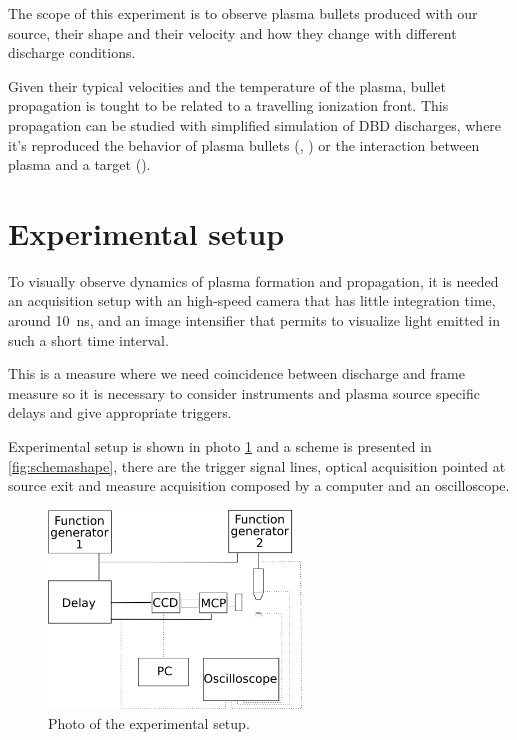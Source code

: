 The scope of this experiment is to observe plasma bullets produced with our source, their shape and their velocity and how they change with different discharge conditions.

Given their typical velocities and the temperature of the plasma, bullet propagation is tought to be related to a travelling ionization front. This propagation can be studied with simplified simulation of DBD discharges, where it's reproduced the behavior of plasma bullets (\cite{doi:10.1063/1.4963115}, \cite{Breden_2012}) or the interaction between plasma and a target (\cite{doi:10.1063/1.4923345}).

\section{Experimental setup}
To visually observe dynamics of plasma formation and propagation, it is needed an acquisition setup with an high-speed camera that has little integration time, around \SI{10}{\nano\second}, and an image intensifier that permits to visualize light emitted in such a short time interval.

This is a measure where we need coincidence between discharge and frame measure so it is necessary to consider instruments and plasma source specific delays and give appropriate triggers.

Experimental setup is shown in photo \ref{fig:fotosetup} and a scheme is presented in \ref{fig:schemashape}, there are the trigger signal lines, optical acquisition pointed at source exit and measure acquisition composed by a computer and an oscilloscope. 
\begin{figure}
 \centering
 \includegraphics[width=0.6\textwidth]{Images/Shape/acq_ottica.png}
 \caption{Photo of the experimental setup.}
 \label{fig:fotosetup}
\end{figure}

